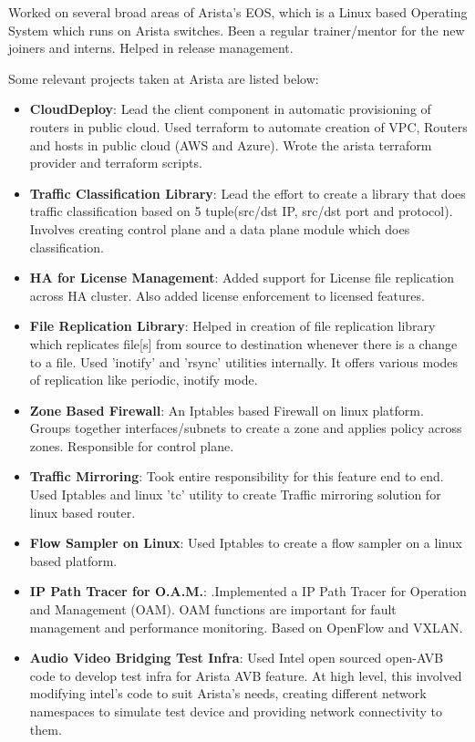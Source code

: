 \documentclass[letterpaper,11pt]{article}
\newcommand{\resumeItem}[2]{
  \item\small{
    \textbf{#1}{: #2 \vspace{-2pt}}
  }
}
\newcommand{\resumeItemListStart}{\begin{itemize}}
\newcommand{\resumeItemListEnd}{\end{itemize}\vspace{-5pt}}
\begin{document}
      \begin{flushleft}Worked on several broad areas of Arista's EOS, which is a Linux based Operating System which runs on Arista switches. Been a regular trainer/mentor for the new joiners and interns. Helped in release management.
      
      Some relevant projects taken at Arista are listed below:
      \end{flushleft}
      \resumeItemListStart
        \resumeItem{CloudDeploy}
          {Lead the client component in automatic provisioning of routers in public cloud. Used terraform to automate creation of VPC, Routers and hosts in public cloud (AWS and Azure). Wrote the arista terraform provider and terraform scripts.}
        \resumeItem{Traffic Classification Library}
          {Lead the effort to create a library that does traffic classification based on 5 tuple(src/dst IP, src/dst port and protocol). Involves creating control plane and a data plane module which does classification.}
        \resumeItem{HA for License Management}
          {Added support for License file replication across HA cluster. Also added license enforcement to licensed features.}
        \resumeItem{File Replication Library}
          {Helped in creation of file replication library which replicates file[s] from source to destination whenever there is a change to a file. Used 'inotify' and 'rsync' utilities internally. It offers various modes of replication like periodic, inotify mode.}
        \resumeItem{Zone Based Firewall}
          {An Iptables based Firewall on linux platform. Groups together interfaces/subnets to create a zone and applies policy across zones. Responsible for control plane.}
        \resumeItem{Traffic Mirroring}
          {Took entire responsibility for this feature end to end. Used Iptables and linux 'tc' utility to create Traffic mirroring solution for linux based router.}
        \resumeItem{Flow Sampler on Linux}
          {Used Iptables to create a flow sampler on a linux based platform.}
        \resumeItem{IP Path Tracer for O.A.M.}
          {.Implemented a IP Path Tracer for Operation and Management (OAM). OAM functions are important for fault management and performance monitoring. Based on OpenFlow and VXLAN.}
        \resumeItem{Audio Video Bridging Test Infra}
          {Used Intel open sourced open-AVB code to develop test infra for Arista AVB feature. At high level, this involved modifying intel's code to suit Arista's needs, creating different network namespaces to simulate test device and providing network connectivity to them.}
      \resumeItemListEnd
\end{document}

